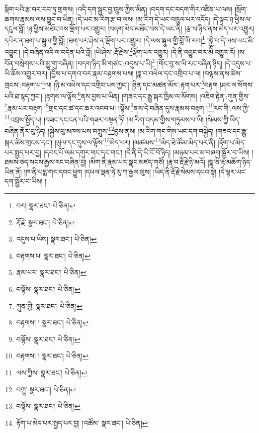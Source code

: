 སྡིག་པའི་རྩ་བར་རབ་ཏུ་གྲགས། །འདི་དག་སྦྱང་བྱ་ཁྲུས་ཀྱིས་མིན། །བདག་དང་བདག་གིར་འཛིན་པ་ལས། །སྲོག་ཆགས་རྣམས་ལས་བྱུང་བ་ཡིན། །དེ་ཡང་མ་རིག་རྩ་བ་ལས། །མ་རིག་དེ་ཡང་འཁྲུལ་པར་འདོད། །དེ་ལྟར་ཉ་ཕྱིས་ལ་དངུལ་བློ། །ཉ་ཕྱིས་མཐོང་བས་ལྡོག་པར་འགྱུར། །བདག་མེད་མཐོང་བས་དེ་ཡང་ནི། །རྩ་བ་ཉིད་ནས་མེད་པར་འགྱུར། དཔེར་ན་ཐག་པ་སྦྲུལ་གྱི་བློ། །ཐག་པར་ཤེས་ན་ལྡོག་པར་འགྱུར། །དེ་ལས་སྦྲུལ་གྱི་བློ་ཡི་རབ།\footnote{བར།  སྣར་ཐང་།  པེ་ཅིན། } །སྐྱེ་བ་དེ་ལས་ཡང་མི་འབྱུང་། །དེ་བཞིན་འདི་ལ་བདེན་པའི་བློ། །ཡེ་ཤེས་:རྡོ་རྗེས་\footnote{རྡོ་རྗེ་  སྣར་ཐང་།  པེ་ཅིན། }ལྡོག་པར་འགྱུར། །དེ་ནི་འབྱུང་བར་མི་འགྱུར་རོ། །ས་བོན་བསྲེགས་པའི་མྱུ་གུ་བཞིན། །བདག་ཉིད་མི་གཙང་:འདུས་པ་ཡི།\footnote{འདུས་པ་ཡིས།  སྣར་ཐང་།  པེ་ཅིན། } །གོང་བུ་ས་ཡི་རང་བཞིན་ཉིད། །དེ་འདུས་པ་ཡི་ཆོས་འགྱུར་བར། །བྱིས་པ་དགའ་བར་རྣམ་བརྟགས་པས། །ཟླ་བ་འཕེལ་དང་འགྲིབ་པ་ལ། །བལྟས་ནས་ཚེས་གྲངས་:བརྟག་པ་\footnote{བརྟགས་པ་  སྣར་ཐང་།  པེ་ཅིན། }ལ། །ཉི་མ་འཕེལ་དང་འགྲིབ་པས་ཀྱང་། །ཉིན་དང་མཚན་མོར་:རྟག་པར་\footnote{རྣམ་པར་  སྣར་ཐང་།  པེ་ཅིན། }བརྟག །ཤར་ལ་སོགས་པའི་ཐ་སྙད་ཀྱང་། །རྟགས་ལ་ལྟོས་\footnote{བལྟོས་  སྣར་ཐང་།  པེ་ཅིན། }ནས་བྱས་པ་ཡིན། །གཟའ་དང་རྒྱུ་སྐར་ཁྱིམ་ལ་སོགས། །འཇིག་རྟེན་:ཀུན་གྱིས་\footnote{ཀུན་གྱི་  སྣར་ཐང་།  པེ་ཅིན། }རྣམ་པར་བརྟག །\footnote{བརྟགས། །  སྣར་ཐང་།  པེ་ཅིན། }གྲང་དང་ཚ་དང་ཆར་འབབ་པ། །ལྟོས་\footnote{བལྟོས་  སྣར་ཐང་།  པེ་ཅིན། }ནས་དེ་བཞིན་དུས་རྣམས་བརྟག །\footnote{བརྟགས། །  སྣར་ཐང་།  པེ་ཅིན། }རང་གི་:ལས་ཀྱི་\footnote{ལས་ཀྱིས་  སྣར་ཐང་།  པེ་ཅིན། }འབྲས་སྤྱོད་པ། །བཟང་དང་ངན་པའི་གཟར་བསྟན་ཏོ། །མ་རིག་འདམ་གྱིས་གཏུམས་པ་ཡི། །སེམས་ཀྱི་ཡིད་བཞིན་ནོར་བུ་ཉིད། །སྐྱེས་བུ་མཁས་པས་བཀྲུས་\footnote{བཀྲུ་  སྣར་ཐང་།  པེ་ཅིན། }བྱས་ནས། །མ་རིག་གང་གིས་ཡང་དག་བསྐྱེད། །གཟའ་དང་རྒྱུ་སྐར་ཚེས་གྲངས་དང་། །ཡུལ་དང་དུས་ལ་ལྟོས་\footnote{བལྟོས་  སྣར་ཐང་།  པེ་ཅིན། }མེད་པར། །མཚམས་\footnote{རྟོག་པ་མེད་པར་སྤྱད་པར་བྱ། །འཚོམ་  སྣར་ཐང་།  པེ་ཅིན། }མེད་ཐེ་ཚོམ་མེད་པར་ནི། །རྟོག་པ་མེད་པར་སྤྱད་པར་བྱ། །དབང་པོ་ལམ་དགུར་གང་དང་གང་། །དེ་ནི་དེ་ཡི་ངོ་བོ་ཉིད། །མཉམ་པར་མ་བཞག་སྦྱོར་བ་ཡིས། །ཐམས་ཅད་སངས་རྒྱས་རང་བཞིན་བྱ། །མིག་ནི་རྣམ་པར་སྣང་མཛད་གཙོ། །རྣ་བ་རྡོ་རྗེ་ཉི་མའོ། །སྣ་ནི་རྟ་མཆོག་ཉིད་ཡིན་ནོ། །ཁ་ནི་པདྨ་གར་དབང་ཕྱུག །དཔལ་ལྡན་ཧེ་རུ་ཀ་རྒྱལ་ལུས། །ཡིད་ནི་རྡོ་རྗེ་སེམས་དཔའ་སྟེ། །དེ་ལྟར་ཡང་དག་སྦྱོར་བ་ཡིས། །

